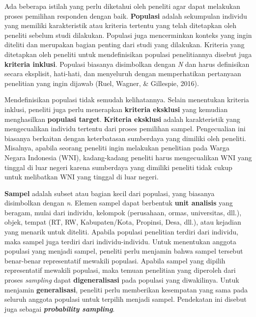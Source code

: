 \documentclass[
  english,
  man]{apa6}
\begin{document}
Ada beberapa istilah yang perlu diketahui oleh peneliti agar dapat melakukan proses pemilihan responden dengan baik. \textbf{Populasi} adalah sekumpulan individu yang memiliki karakteristik atau kriteria tertentu yang telah ditetapkan oleh peneliti sebelum studi dilakukan. Populasi juga mencerminkan konteks yang ingin diteliti dan merupakan bagian penting dari studi yang dilakukan. Kriteria yang ditetapkan oleh peneliti untuk mendefinisikan populasi penelitiannya disebut juga \textbf{kriteria inklusi}. Populasi biasanya disimbolkan dengan \emph{N} dan harus definisikan secara eksplisit, hati-hati, dan menyeluruh dengan memperhatikan pertanyaan penelitian yang ingin dijawab (Ruel, Wagner, \& Gillespie, 2016).

Mendefinisikan populasi tidak semudah kelihatannya. Selain menentukan kriteria inklusi, peneliti juga perlu menerapkan \textbf{kriteria eksklusi} yang kemudian menghasilkan \textbf{populasi target}. \textbf{Kriteria eksklusi} adalah karakteristik yang mengecualikan individu tertentu dari proses pemilihan sampel. Pengecualian ini biasanya berkaitan dengan keterbatasan sumberdaya yang dimiliki oleh peneliti. Misalnya, apabila seorang peneliti ingin melakukan penelitian pada Warga Negara Indonesia (WNI), kadang-kadang peneliti harus mengecualikan WNI yang tinggal di luar negeri karena sumberdaya yang dimiliki peneliti tidak cukup untuk melibatkan WNI yang tinggal di luar negeri.

\textbf{Sampel} adalah subset atau bagian kecil dari populasi, yang biasanya disimbolkan dengan \emph{n}. Elemen sampel dapat berbentuk \textbf{unit analisis} yang beragam, mulai dari individu, kelompok (perusahaan, ormas, universitas, dll.), objek, tempat (RT, RW, Kabupaten/Kota, Propinsi, Desa, dll.), atau kejadian yang menarik untuk diteliti. Apabila populasi penelitian terdiri dari individu, maka sampel juga terdiri dari individu-individu. Untuk menentukan anggota populasi yang menjadi sampel, peneliti perlu menjamin bahwa sampel tersebut benar-benar representatif mewakili populasi. Apabila sampel yang dipilih representatif mewakili populasi, maka temuan penelitian yang diperoleh dari proses \emph{sampling} dapat \textbf{digeneralisasi} pada populasi yang diwakilinya. Untuk menjamin \textbf{generalisasi}, peneliti perlu memberikan kesempatan yang sama pada seluruh anggota populasi untuk terpilih menjadi sampel. Pendekatan ini disebut juga sebagai \textbf{\emph{probability sampling}}.
\end{document}
